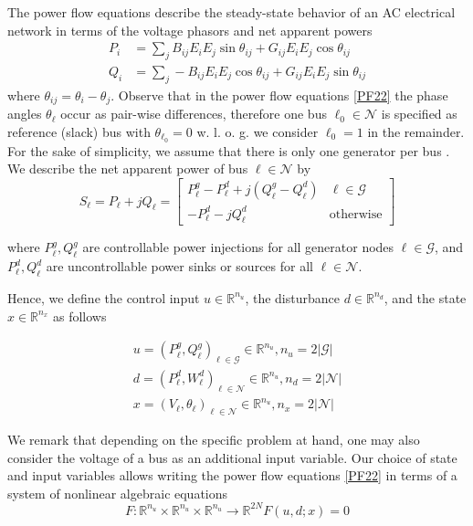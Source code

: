 The power flow equations describe the steady-state behavior of an AC electrical network in terms of the voltage phasors and net apparent powers
\begin{subequations}
\begin{align}
P_i&=\sum_j B_{ij}E_iE_j\sin{\theta_{ij}}+G_{ij}E_iE_j\cos{\theta_{ij}}\\
Q_i&=\sum_j- B_{ij}E_iE_j\cos{\theta_{ij}}+G_{ij}E_iE_j\sin{\theta_{ij}}
\end{align}
\label{PF22}
\end{subequations}
where $\theta_{ij}=\theta_i-\theta_j$.
Observe that in the power flow equations \eqref{PF22} the phase angles $\theta_{\ell}$
 occur as pair-wise differences, therefore one bus $\ell_0\in\mathcal{N}$
 is specified as reference (slack) bus with $\theta_{\ell_0}=0$
w. l. o. g. we consider $\ell_0=1$
 in the remainder. For the sake of simplicity, we assume that there is only one generator per bus . We describe the net apparent power of bus $\ell\in\mathcal{N}$ by 
 \[S_{\ell}=P_{\ell}+jQ_{\ell}=\begin{bmatrix}
 P_{\ell}^g-P_{\ell}^d+j(Q_{\ell}^g-Q_{\ell}^d) & \ell \in \mathcal{G}\\
 -P_{\ell}^d-jQ_{\ell}^d & \mbox{otherwise}
 \end{bmatrix}\]
 
where $P_{\ell}^g,Q_{\ell}^g$
 are controllable power injections for all generator nodes $\ell\in\mathcal{G}$, and $P_{\ell}^d,Q_{\ell}^d$
 are uncontrollable power sinks or sources for all $\ell\in\mathcal{N}$.
 
 Hence, we define the control input $u\in\mathbb{R}^{n_u}$, the disturbance $d\in\mathbb{R}^{n_d}$, and the state $x\in\mathbb{R}^{n_x}$ as follows
 
 
 \begin{align}
 u = (P_{\ell}^g, Q_{\ell}^g)_{\ell\in\mathcal{G}} \in \mathbb{R}^{n_u}, n_u=2|\mathcal{G}|\\
 d = (P_{\ell}^d, W_{\ell}^d)_{\ell\in\mathcal{N}} \in \mathbb{R}^{n_u}, n_d=2|\mathcal{N}|\\
 x = (V_{\ell},\theta_{\ell})_{\ell\in\mathcal{N}} \in \mathbb{R}^{n_u}, n_x=2|\mathcal{N}|
 \end{align}
 
We remark that depending on the specific problem at hand, one may also consider the voltage of a bus as an additional input variable. Our choice of state and input variables allows writing the power flow equations \eqref{PF22} in terms of a system of nonlinear algebraic equations
\[F:\mathbb{R}^{n_u}\times\mathbb{R}^{n_u}\times \mathbb{R}^{n_u}\rightarrow \mathbb{R}^{2N} F(u,d;x)=0\]

